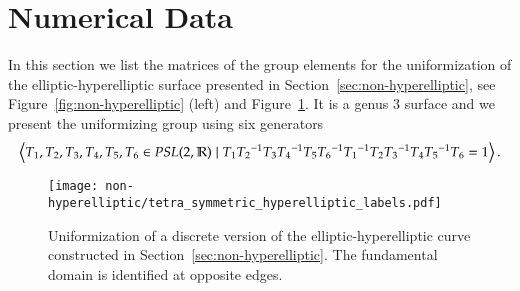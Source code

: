 \documentclass[Thesis.tex]{subfiles}
\begin{document}
\subfilebibliography

\section{Numerical Data}

In this section we list the matrices of the group elements for the uniformization of the elliptic-hyperelliptic surface presented in Section~\ref{sec:non-hyperelliptic}, see Figure~\ref{fig:non-hyperelliptic} (left) and Figure~\ref{fig:elliptic-hyperelliptic-data}. It is a genus $3$ surface and we present the uniformizing group using six generators
\[
\left<T_1,T_2,T_3,T_4,T_5,T_6 \in {\it PSL}(2,\mathbb R) \mid T_1{T_2}^{-1}T_3{T_4}^{-1}T_5{T_6}^{-1} {T_1}^{-1}T_2{T_3}^{-1}T_4{T_5}^{-1}T_6 = 1
\right>.
\]

\begin{figure}
\centering
\texttt{[image: non-hyperelliptic/tetra\_symmetric\_hyperelliptic\_labels.pdf]}
\caption{Uniformization of a discrete version of the elliptic-hyperelliptic curve constructed in Section~\ref{sec:non-hyperelliptic}.  The fundamental domain is identified at opposite edges.}
\label{fig:elliptic-hyperelliptic-data}
\end{figure}


\end{document}
